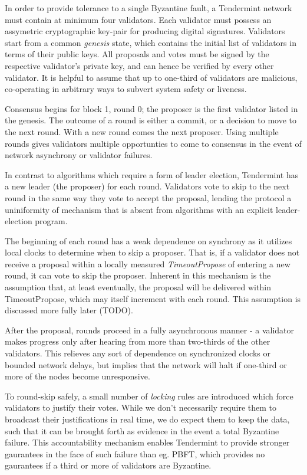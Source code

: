 In order to provide tolerance to a single Byzantine fault, a Tendermint network must contain at minimum four validators.
Each validator must possess an assymetric cryptographic key-pair for producing digital signatures.
Validators start from a common \emph{genesis} state, which contains the initial list of validators in terms of their public keys.
All proposals and votes must be signed by the respective validator's private key, and can hence be verified by every other validator.
It is helpful to assume that up to one-third of validators are malicious, co-operating in arbitrary ways to subvert system safety or liveness.

Consensus begins for block 1, round 0; the proposer is the first validator listed in the genesis.
The outcome of a round is either a commit, or a decision to move to the next round.
With a new round comes the next proposer.
Using multiple rounds gives validators multiple opportunties to come to consensus in the event of network asynchrony or validator failures.

In contrast to algorithms which require a form of leader election, Tendermint has a new leader (the proposer) for each round.
Validators vote to skip to the next round in the same way they vote to accept the proposal,
lending the protocol a uniniformity of mechanism that is absent from algorithms with an explicit leader-election program.

The beginning of each round has a weak dependence on synchrony as it utilizes local clocks to determine when to skip a proposer.
That is, if a validator does not receive a proposal within a locally measured \emph{TimeoutPropose} of entering a new round, it can vote to skip the proposer.
Inherent in this mechanism is the assumption that, at least eventually, the proposal will be delivered within TimeoutPropose, which may itself increment with each round.
This assumption is discussed more fully later (TODO).

After the proposal, rounds proceed in a fully asynchronous manner - a validator makes progress only after hearing from more than two-thirds of the other validators.
This relieves any sort of dependence on synchronized clocks or bounded network delays,
but implies that the network will halt if one-third or more of the nodes become unresponsive.

To round-skip safely, a small number of \emph{locking} rules are introduced which force validators to justify their votes.
While we don't necessarily require them to broadcast their justifications in real time, we do expect them to keep the data,
such that it can be brought forth as evidence in the event a total Byzantine failure.
This accountability mechanism enables Tendermint to provide stronger gaurantees in the face of such failure than eg. PBFT,
which provides no gaurantees if a third or more of validators are Byzantine.

